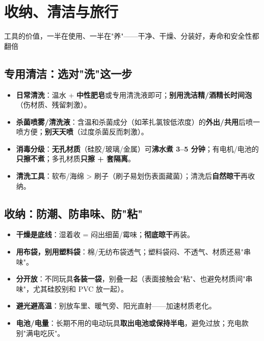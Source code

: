 \documentclass[12pt,UTF8,openany]{ctexbook}
\begin{document}
\chapter{收纳、清洁与旅行}

\begin{center}
\myhei\large 工具的价值，一半在使用、一半在"养"——干净、干燥、分装好，寿命和安全性都翻倍
\end{center}

\section{专用清洁：选对"洗"这一步}
\begin{itemize}[leftmargin=2em,itemsep=0.3em]
  \item \textbf{日常清洗}：温水 + \textbf{中性肥皂}或专用清洗液即可；\textbf{别用洗洁精/酒精长时间泡}（伤材质、残留刺激）。
  \item \textbf{杀菌喷雾/清洗液}：含温和杀菌成分（如苯扎氯铵低浓度）的\textbf{外出/共用}后喷一喷方便；\textbf{别天天喷}（过度杀菌反而刺激）。
  \item \textbf{消毒分级}：\textbf{无孔材质}（硅胶/玻璃/金属）可\textbf{沸水煮 3--5 分钟}；有电机/电池的\textbf{只擦不煮}；多孔材质\textbf{只擦 + 套隔离}。
  \item \textbf{清洗工具}：软布/海绵 > 刷子（刷子易划伤表面藏菌）；清洗后\textbf{自然晾干}再收纳。
\end{itemize}

\section{收纳：防潮、防串味、防"粘"}
\begin{itemize}[leftmargin=2em,itemsep=0.3em]
  \item \textbf{干燥是底线}：湿着收 = 闷出细菌/霉味；\textbf{彻底晾干}再装。
  \item \textbf{用布袋，别用塑料袋}：棉/无纺布袋透气；塑料袋闷、不透气、材质还易"串味"。
  \item \textbf{分开放}：不同玩具\textbf{各装一袋}，别叠一起（表面接触会"粘"、也避免材质间"串味"，尤其硅胶别和 PVC 放一起）。
  \item \textbf{避光避高温}：别放车里、暖气旁、阳光直射——加速材质老化。
  \item \textbf{电池/电量}：长期不用的电动玩具\textbf{取出电池或保持半电}，避免过放；充电款别"满电吃灰"。
\end{itemize}
\end{document}
